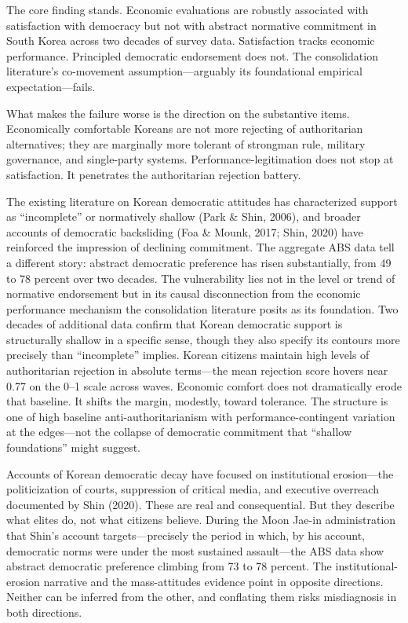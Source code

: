 \documentclass[
  12pt,
  12pt,
  letterpaper]{article}
\begin{document}
The core finding stands. Economic evaluations are robustly associated
with satisfaction with democracy but not with abstract normative
commitment in South Korea across two decades of survey data.
Satisfaction tracks economic performance. Principled democratic
endorsement does not. The consolidation literature's co-movement
assumption---arguably its foundational empirical expectation---fails.

What makes the failure worse is the direction on the substantive items.
Economically comfortable Koreans are not more rejecting of authoritarian
alternatives; they are marginally more tolerant of strongman rule,
military governance, and single-party systems. Performance-legitimation
does not stop at satisfaction. It penetrates the authoritarian rejection
battery.

The existing literature on Korean democratic attitudes has characterized
support as ``incomplete'' or normatively shallow (Park \& Shin, 2006),
and broader accounts of democratic backsliding (Foa \& Mounk, 2017;
Shin, 2020) have reinforced the impression of declining commitment. The
aggregate ABS data tell a different story: abstract democratic
preference has risen substantially, from 49 to 78 percent over two
decades. The vulnerability lies not in the level or trend of normative
endorsement but in its causal disconnection from the economic
performance mechanism the consolidation literature posits as its
foundation. Two decades of additional data confirm that Korean
democratic support is structurally shallow in a specific sense, though
they also specify its contours more precisely than ``incomplete''
implies. Korean citizens maintain high levels of authoritarian rejection
in absolute terms---the mean rejection score hovers near 0.77 on the
0--1 scale across waves. Economic comfort does not dramatically erode
that baseline. It shifts the margin, modestly, toward tolerance. The
structure is one of high baseline anti-authoritarianism with
performance-contingent variation at the edges---not the collapse of
democratic commitment that ``shallow foundations'' might suggest.

Accounts of Korean democratic decay have focused on institutional
erosion---the politicization of courts, suppression of critical media,
and executive overreach documented by Shin (2020). These are real and
consequential. But they describe what elites do, not what citizens
believe. During the Moon Jae-in administration that Shin's account
targets---precisely the period in which, by his account, democratic
norms were under the most sustained assault---the ABS data show abstract
democratic preference climbing from 73 to 78 percent. The
institutional-erosion narrative and the mass-attitudes evidence point in
opposite directions. Neither can be inferred from the other, and
conflating them risks misdiagnosis in both directions.
\end{document}
